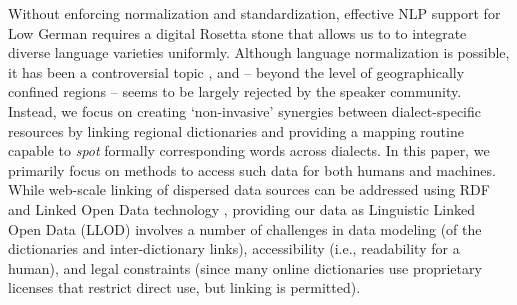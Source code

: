 Without enforcing normalization and standardization, effective NLP support for Low German requires a digital Rosetta stone that allows us to to integrate diverse language varieties uniformly. Although language normalization is possible, it has been a controversial topic \cite{Christiansen1975}, and -- beyond the level of geographically confined regions -- seems to be largely rejected by the speaker community. Instead, we focus on creating `non-invasive' synergies between dialect-specific resources by linking regional dictionaries and providing a mapping routine capable to \emph{spot} formally corresponding words across dialects. In this paper, we primarily focus on methods to access such data for both humans and machines. While web-scale linking of dispersed data sources can be addressed using RDF and Linked Open Data technology \cite[p.3-9]{cimiano2020linguistic}, providing our data as Linguistic Linked Open Data (LLOD) involves a number of challenges in data modeling (of the dictionaries and inter-dictionary links), accessibility (i.e., readability for a human), and legal constraints (since many online dictionaries use proprietary licenses that restrict direct use, but linking is permitted).

